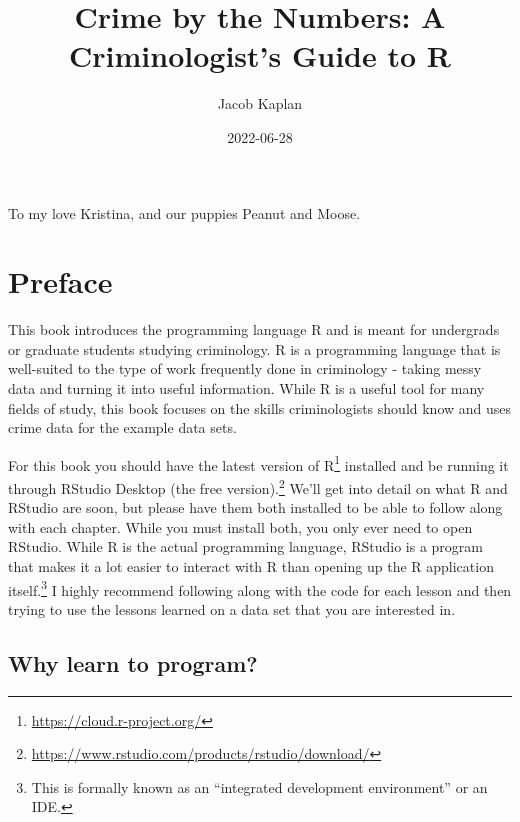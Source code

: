 \documentclass[
  a4paper,
]{krantz}
\title{Crime by the Numbers: A Criminologist's Guide to R}
\author{Jacob Kaplan}
\date{2022-06-28}
\renewcommand{\href}[2]{#2\footnote{\url{#1}}}
\begin{document}
\maketitle

\thispagestyle{empty}
\begin{center}
To my love Kristina, and our puppies Peanut and Moose.
\end{center}

\setlength{\abovedisplayskip}{-5pt}
\setlength{\abovedisplayshortskip}{-5pt}

{
\hypersetup{linkcolor=}
\setcounter{tocdepth}{2}
\tableofcontents
}

\frontmatter

\hypertarget{preface}{%
\chapter*{Preface}\label{preface}}


This book introduces the programming language R and is meant
for undergrads or graduate students studying criminology. R
is a programming language that is well-suited to the type of
work frequently done in criminology - taking messy data and
turning it into useful information. While R is a useful tool
for many fields of study, this book focuses on the skills
criminologists should know and uses crime data for the
example data sets.

For this book you should have the latest version of
\href{https://cloud.r-project.org/}{R} installed and be
running it through
\href{https://www.rstudio.com/products/rstudio/download/}{RStudio
Desktop (the free version).} We'll get into detail on what R
and RStudio are soon, but please have them both installed to
be able to follow along with each chapter. While you must
install both, you only ever need to open RStudio. While R is
the actual programming language, RStudio is a program that
makes it a lot easier to interact with R than opening up the
R application itself.\footnote{This is formally known as an
  ``integrated development environment'' or an IDE.} I
highly recommend following along with the code for each
lesson and then trying to use the lessons learned on a data
set that you are interested in.

\hypertarget{why-learn-to-program}{%
\section*{Why learn to
program?}\label{why-learn-to-program}}
\end{document}
